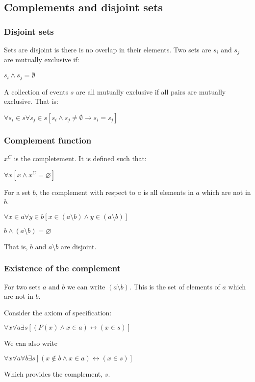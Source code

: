 
\subsection{Complements and disjoint sets}

\subsubsection{Disjoint sets}

Sets are disjoint is there is no overlap in their elements. Two sets are \(s_i\) and \(s_j\) are mutually exclusive if:

\(s_i\land s_j=\emptyset\)

A collection of events \(s\) are all mutually exclusive if all pairs are mutually exclusive. That is:

\(\forall s_i \in s\forall s_j\in s[s_i\land s_j\ne \emptyset \rightarrow s_i=s_j]\)

\subsubsection{Complement function}

\(x^C\) is the completement. It is defined such that:

\(\forall x [x\land x^C=\varnothing ]\)

For a set \(b\), the complement with respect to \(a\) is all elements in \(a\) which are not in \(b\).

\(\forall x \in a \forall y \in b [x \in (a \setminus b) \land y\in (a \setminus b)]\)

\(b\land (a \setminus b)= \varnothing \)

That is, \(b\) and \(a \setminus b\) are disjoint.

\subsubsection{Existence of the complement}

For two sets \(a\) and \(b\) we can write \((a \setminus b)\). This is the set of elements of \(a\) which are not in \(b\).

Consider the axiom of specification:

\(\forall x \forall a \exists s[(P(x)\land x\in a )\leftrightarrow (x\in s)]\)

We can also write

\(\forall x \forall a \forall b\exists s[(x\not\in b\land x\in a )\leftrightarrow (x\in s)]\)

Which provides the complement, \(s\).

